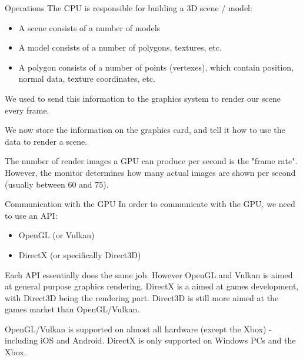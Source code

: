 \documentclass[handout,18pt]{beamer}
\begin{document}
\begin{frame}{Operations}
\pause
The CPU is responsible for building a 3D scene / model:
\begin{itemize}
\pause \item A scene consists of a number of models
\pause \item A model consists of a number of polygons, textures, etc.
\pause \item A polygon consists of a number of points (vertexes), which contain position, normal data, texture coordinates, etc.
\end{itemize}
\pause

\vspace{11pt}
We used to send this information to the graphics system to render our scene every frame.
\pause

\vspace{11pt}
We now store the information on the graphics card, and tell it how to use the data to render a scene.
\pause

\vspace{11pt}
The number of render images a GPU can produce per second is the "frame rate".  However, the monitor determines how many actual images are shown per second (usually between 60 and 75).
\end{frame}

\begin{frame}{Communication with the GPU}
\pause
In order to communicate with the GPU, we need to use an API:
\begin{itemize}
\item OpenGL (or Vulkan)
\item DirectX (or specifically Direct3D)
\end{itemize}
\pause

\vspace{11pt}
Each API essentially does the same job.  However OpenGL and Vulkan is aimed at general purpose graphics rendering.  DirectX is a aimed at games development, with Direct3D being the rendering part.  Direct3D is still more aimed at the games market than OpenGL/Vulkan.
\pause

\vspace{11pt}
OpenGL/Vulkan is supported on almost all hardware (except the Xbox) - including iOS and Android.  DirectX is only supported on Windows PCs and the Xbox.
\end{frame}
\end{document}
